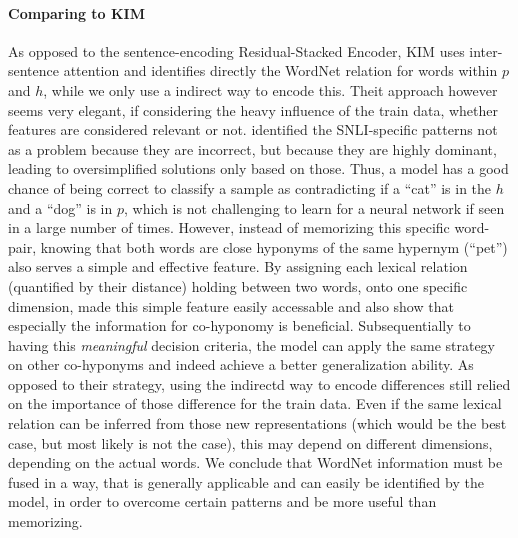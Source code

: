 \paragraph*{Comparing to \ac{KIM}}
As opposed to the sentence-encoding Residual-Stacked Encoder, \ac{KIM} \citep{chen-EtAl:2017b:natural} uses inter-sentence attention and identifies directly the WordNet relation for words within $p$ and $h$, while we only use a indirect way to encode this. Theit approach however seems very elegant, if considering the heavy influence of the train data, whether features are considered relevant or not. \cite{gururangan2018annotation} identified the \ac{SNLI}-specific patterns not as a problem because they are incorrect, but because they are highly dominant, leading to oversimplified solutions only based on those. Thus, a model has a good chance of being correct to classify a sample as contradicting if a ``cat'' is in the $h$ and a ``dog'' is in $p$, which is not challenging to learn for a neural network if seen in a large number of times. However, instead of memorizing this specific word-pair, knowing that both words are close hyponyms of the same hypernym (``pet'') also serves a simple and effective feature. By assigning each lexical relation (quantified by their distance) holding between two words, onto one specific dimension, \cite{chen-EtAl:2017b:natural} made this simple feature easily accessable and also show that especially the information for co-hyponomy is beneficial. Subsequentially to having this \textit{meaningful} decision criteria, the model can apply the same strategy on other co-hyponyms and indeed achieve a better generalization ability. As opposed to their strategy, using the indirectd way to encode differences still relied on the importance of those difference for the train data. Even if the same lexical relation can be inferred from those new representations (which would be the best case, but most likely is not the case), this may depend on different dimensions, depending on the actual words. We conclude that WordNet information must be fused in a way, that is generally applicable and can easily be identified by the model, in order to overcome certain patterns and be more useful than memorizing.